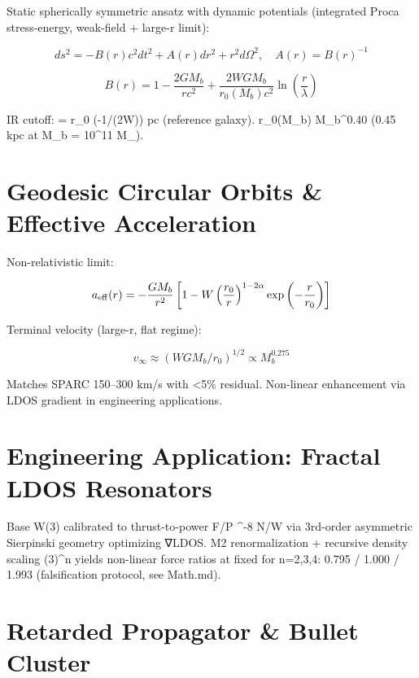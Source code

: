 \documentclass[12pt,a4paper]{article}
\begin{document}
Static spherically symmetric ansatz with dynamic potentials (integrated Proca stress-energy, weak-field + large-r limit):

\begin{equation}
ds^2 = -B(r) c^2 dt^2 + A(r) dr^2 + r^2 d\Omega^2, \quad A(r) = B(r)^{-1}
\end{equation}

\begin{equation}
B(r) = 1 - \frac{2 G M_b}{r c^2} + \frac{2 W G M_b}{r_0(M_b) c^2} \ln\left( \frac{r}{\lambda} \right)
\end{equation}

IR cutoff: \lambda = r_0 \exp(-1/(2W))  pc (reference galaxy).  
r_0(M_b) \propto M_b^{0.40} (0.45 kpc at M_b = 10^{11} M_\odot).

\section{Geodesic Circular Orbits \& Effective Acceleration}

Non-relativistic limit:

\begin{equation}
a_{\rm eff}(r) = -\frac{G M_b}{r^2} 
\left[ 1 - W \left( \frac{r_0}{r} \right)^{1-2\alpha} \exp\left( -\frac{r}{r_0} \right) \right]
\end{equation}

Terminal velocity (large-r, flat regime):

\begin{equation}
v_\infty \approx \left( W G M_b / r_0 \right)^{1/2} \propto M_b^{0.275}
\end{equation}

Matches SPARC 150–300 km/s with <5\% residual. Non-linear enhancement via LDOS gradient in engineering applications.

\section{Engineering Application: Fractal LDOS Resonators}

Base W(3)  calibrated to thrust-to-power F/P  ^{-8} N/W via 3rd-order asymmetric Sierpinski geometry optimizing ∇LDOS. M2 renormalization + recursive density scaling \approx (3\alpha)^n yields non-linear force ratios at fixed  for n=2,3,4: 0.795 / 1.000 / 1.993 (falsification protocol, see Math.md).

\section{Retarded Propagator \& Bullet Cluster}
\end{document}
